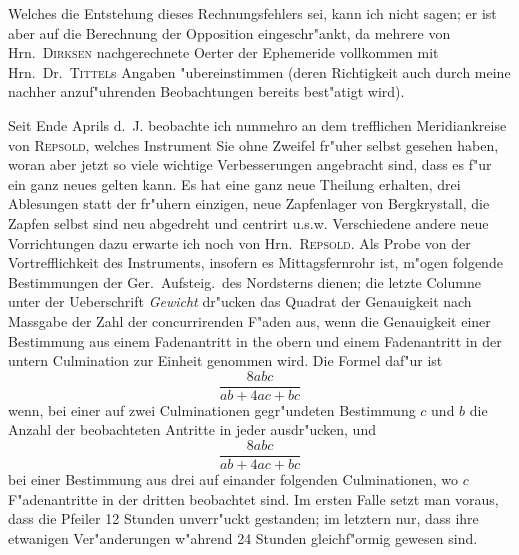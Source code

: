 \documentclass[12pt,a4paper]{article}
\begin{document}
Welches die Entstehung dieses Rechnungsfehlers sei, kann ich nicht sagen; er ist aber auf die
Berechnung der Opposition eingeschr"ankt, da mehrere von Hrn.~\textsc{Dirksen} nachgerechnete Oerter der
Ephemeride vollkommen mit Hrn.~Dr.~\textsc{Tittel}s Angaben "ubereinstimmen (deren Richtigkeit auch durch
meine nachher anzuf"uhrenden Beobachtungen bereits best"atigt wird).

Seit Ende Aprils d.~J. beobachte ich nunmehro an dem trefflichen Meridiankreise von \textsc{Repsold},
welches Instrument Sie ohne Zweifel fr"uher selbst gesehen haben, woran aber jetzt so viele wichtige
Verbesserungen angebracht sind, dass es f"ur ein ganz neues gelten kann. Es hat eine ganz neue Theilung
erhalten, drei Ablesungen statt der fr"uhern einzigen, neue Zapfenlager von Bergkrystall, die Zapfen selbst
sind neu abgedreht und centrirt u.s.w. Verschiedene andere neue Vorrichtungen dazu erwarte ich noch
von Hrn.~\textsc{Repsold}. Als Probe von der Vortrefflichkeit des Instruments, insofern es Mittagsfernrohr
ist, m"ogen folgende Bestimmungen der Ger.~Aufsteig.~des Nordsterns dienen; die letzte Columne unter
der Ueberschrift \textit{Gewicht} dr"ucken das Quadrat der Genauigkeit nach Massgabe der Zahl der concurrirenden
F"aden aus, wenn die Genauigkeit einer Bestimmung aus einem Fadenantritt in the obern und einem
Fadenantritt in der untern Culmination zur Einheit genommen wird. Die Formel daf"ur ist
\[\frac{8abc}{ab + 4ac + bc}\]
wenn, bei einer auf zwei Culminationen gegr"undeten Bestimmung $c$ und $b$ die Anzahl der beobachteten
Antritte in jeder ausdr"ucken, und
\[\frac{8abc}{ab + 4ac + bc}\]
bei einer Bestimmung aus drei auf einander folgenden Culminationen, wo $c$ F"adenantritte in der dritten
beobachtet sind. Im ersten Falle setzt man voraus, dass die Pfeiler 12 Stunden unverr"uckt gestanden;
im letztern nur, dass ihre etwanigen Ver"anderungen w"ahrend 24 Stunden gleichf"ormig gewesen sind.

\newpage
\end{document}
